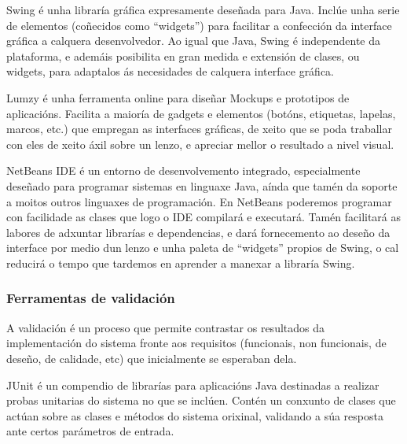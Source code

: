 
Swing é unha libraría gráfica expresamente deseñada para Java. Inclúe unha serie de elementos (coñecidos como ``widgets'') para facilitar a confección da interface gráfica a calquera desenvolvedor. Ao igual que Java, Swing é independente da plataforma, e ademáis posibilita en gran medida e extensión de clases, ou widgets, para adaptalos ás necesidades de calquera interface gráfica.


Lumzy \cite{lumzy} é unha ferramenta online para diseñar Mockups e prototipos de aplicacións. Facilita a maioría de gadgets e elementos (botóns, etiquetas, lapelas, marcos, etc.) que empregan as interfaces gráficas, de xeito que se poda traballar con eles de xeito áxil sobre un lenzo, e apreciar mellor o resultado a nivel visual.


NetBeans IDE é un entorno de desenvolvemento integrado, especialmente deseñado para programar sistemas en linguaxe Java, aínda que tamén da soporte a moitos outros linguaxes de programación. En NetBeans poderemos programar con facilidade as clases que logo o IDE compilará e executará. Tamén facilitará as labores de adxuntar librarías e dependencias, e dará fornecemento ao deseño da interface por medio dun lenzo e unha paleta de ``widgets'' propios de Swing, o cal reducirá o tempo que tardemos en aprender a manexar a libraría Swing.

\subsubsection{Ferramentas de validación}

A validación é un proceso que permite contrastar os resultados da implementación do sistema fronte aos requisitos (funcionais, non funcionais, de deseño, de calidade, etc) que inicialmente se esperaban dela.


JUnit \cite{junit} é un compendio de librarías para aplicacións Java destinadas a realizar probas unitarias do sistema no que se inclúen. Contén un conxunto de clases que actúan sobre as clases e métodos do sistema orixinal, validando a súa resposta ante certos parámetros de entrada.